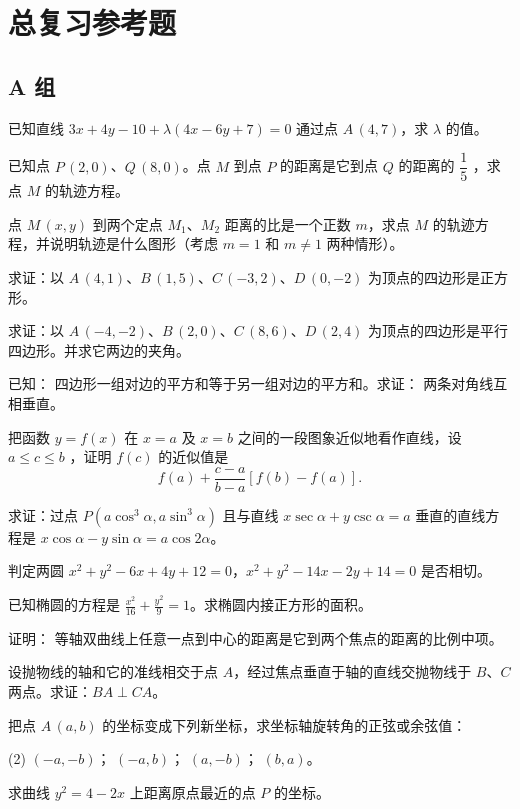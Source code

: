 \chapter*{总复习参考题}
\section*{A 组}
\begin{question}
  \item 已知直线 $3x+4y-10+\lambda(4x-6y+7)=0$ 通过点 $A\,(4,7)$，求 $\lambda$ 的值。
  \item 已知点 $P\,(2,0)$、$Q\,(8,0)$。点 $M$ 到点 $P$ 的距离是它到点 $Q$ 的距离的 $\dfrac{1}{5}$ ，求点 $M$ 的轨迹方程。
  \item 点 $M\,(x,y)$ 到两个定点 $M_1$、$M_2$ 距离的比是一个正数 $m$，求点 $M$ 的轨迹方程，并说明轨迹是什么图形（考虑 $m = 1$ 和 $m \neq 1$ 两种情形）。
  \item 求证：以 $A\,(4,1)$、$B\,(1,5)$、$C\,(-3,2)$、$D\,(0,-2)$ 为顶点的四边形是正方形。
  \item 求证：以 $A\,(-4,-2)$、$B\,(2,0)$、$C\,(8,6)$、$D\,(2,4)$ 为顶点的四边形是平行四边形。并求它两边的夹角。
  \item 已知： 四边形一组对边的平方和等于另一组对边的平方和。求证： 两条对角线互相垂直。
  \item 把函数 $y=f(x)$ 在 $x=a$ 及 $x=b$ 之间的一段图象近似地看作直线，设 $a\leqslant c\leqslant b$ ，证明 $f(c)$ 的近似值是
  \[ f(a)+\frac{c-a}{b-a}[f(b)-f(a)].\]
  \item 求证：过点 $P(a\cos^3\alpha,a\sin^3\alpha)$ 且与直线 $x\sec\alpha+y\csc\alpha=a$ 垂直的直线方程是 $x\cos\alpha-y\sin\alpha=a\cos2\alpha$。
  \item 判定两圆 $x^2+y^2-6x+4y+12=0$，$x^2+y^2-14x-2y+14=0$ 是否相切。
  \item 已知椭圆的方程是 $\frac{x^2}{16}+\frac{y^2}{9}=1$。求椭圆内接正方形的面积。
  \item 证明： 等轴双曲线上任意一点到中心的距离是它到两个焦点的距离的比例中项。
  \item 设抛物线的轴和它的准线相交于点 $A$，经过焦点垂直于轴的直线交抛物线于 $B$、$C$ 两点。求证：$BA\perp CA$。
  \item 把点 $A\,(a,b)$ 的坐标变成下列新坐标，求坐标轴旋转角的正弦或余弦值：
  \begin{tasks}(2)
    \task $(-a,-b)$；
    \task $(-a,b)$；
    \task $(a,-b)$；
    \task $(b,a)$。
  \end{tasks}
  \item 求曲线 $y^2=4-2x$ 上距离原点最近的点 $P$ 的坐标。

\end{question}
